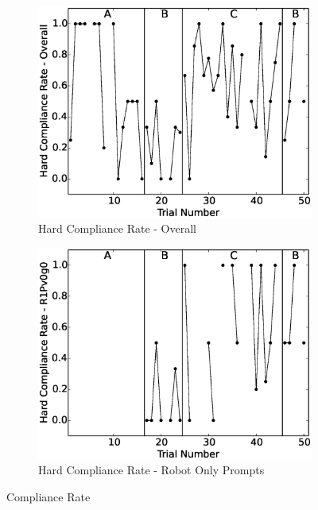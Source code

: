 \begin{figure}[h]
	
	\begin{subfigure}[b]{0.49\textwidth}
		\includegraphics[width=1.1\linewidth]{./img/data_analysis/103HardComplianceRate-Overall.eps}
		\caption{Hard Compliance Rate - Overall}
		\label{fig:103HardComplianceRate-Overall}
	\end{subfigure}
	\hfill
	\begin{subfigure}[b]{0.49\textwidth}
		\includegraphics[width=1.1\linewidth]{./img/data_analysis/92HardComplianceRate-R1Pv0g0.eps}
		\caption{Hard Compliance Rate - Robot Only Prompts}
		\label{fig:92HardComplianceRate-R1Pv0g0}
	\end{subfigure}%
	\caption{Compliance Rate}
	\label{fig:ComplianceRate}
\end{figure}


